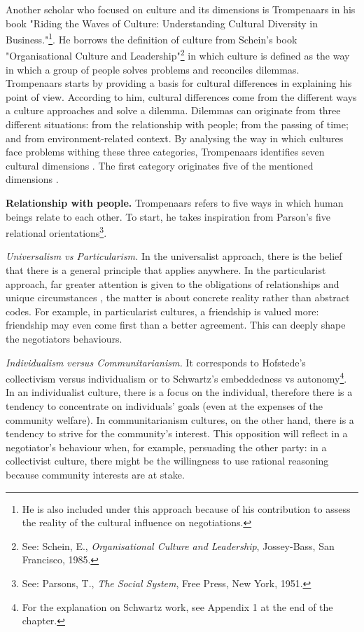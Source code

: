 \documentclass[../main.tex]{subfiles}
\begin{document}
Another scholar who focused on culture and its dimensions is Trompenaars in his book "Riding the Waves of Culture: Understanding Cultural Diversity in Business."\footnote{He is also included under this approach because of his contribution to assess the reality of the cultural influence on negotiations.}. He borrows the definition of culture from Schein's book "Organisational Culture and Leadership"\footnote{See: Schein, E., \textit{Organisational Culture and Leadership}, Jossey-Bass, San Francisco, 1985.} in which culture is defined as the way in which a group of people solves problems and reconciles dilemmas. Trompenaars starts by providing a basis for cultural differences in explaining his point of view. According to him, cultural differences come from the different ways a culture approaches and solve a dilemma. Dilemmas can originate from three different situations: from the relationship with people; from the passing of time; and from environment-related context. By analysing the way in which cultures face problems withing these three categories, Trompenaars identifies seven cultural dimensions . The first category originates five of the mentioned dimensions \autocite[8]{trompenaars}.

\textbf{Relationship with people.} Trompenaars refers to five ways in which human beings relate to each other. To start, he takes inspiration from Parson's five relational orientations\footnote{See: Parsons, T., \textit{The Social System}, Free Press, New York, 1951.}.

\textit{Universalism vs Particularism.} In the universalist approach, there is the belief that there is a general principle that applies anywhere. In the particularist approach, far greater attention is given to the obligations of relationships and unique circumstances \autocite[9]{trompenaars}, the matter is about concrete reality rather than abstract codes. For example, in particularist cultures, a friendship is valued more: friendship may even come first than a better agreement. This can deeply shape the negotiators behaviours.

\textit{Individualism versus Communitarianism.} It corresponds to Hofstede's collectivism versus individualism or to Schwartz's embeddedness vs autonomy\footnote{For the explanation on Schwartz work, see Appendix 1 at the end of the chapter.}. In an individualist culture, there is a focus on the individual, therefore there is a tendency to concentrate on individuals' goals (even at the expenses of the community welfare). In communitarianism cultures, on the other hand, there is a tendency to strive for the community's interest. This opposition will reflect in a negotiator's behaviour when, for example, persuading the other party: in a collectivist culture, there might be the willingness to use rational reasoning because community interests are at stake.
\end{document}
